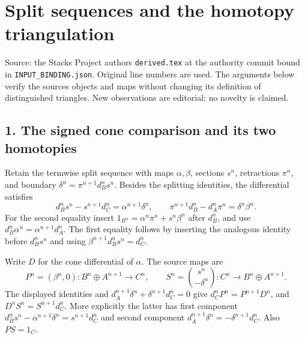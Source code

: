 \documentclass[11pt]{article}
\begin{document}
\section{Split sequences and the homotopy triangulation}\label{proofs-2995-3485-split-sequences-and-the-homotopy-triangulation}

Source:\allowbreak{} the Stacks Project authors\textquotesingle{} \texttt{derived.\allowbreak{}tex} at the authority commit bound in \texttt{INPUT\_\allowbreak{}BINDING.\allowbreak{}json}. Original line numbers are used. The arguments below verify the source\textquotesingle s objects and maps without changing its definition of distinguished triangles. New observations are editorial; no novelty is claimed.

\subsection{1. The signed cone comparison and its two homotopies}\label{proofs-2995-3485-the-signed-cone-comparison-and-its-two-homotopies}

Retain the termwise split sequence with maps \(\alpha,\beta\),\allowbreak{} sections \(s^n\),\allowbreak{} retractions \(\pi^n\),\allowbreak{} and boundary \(\delta^n=\pi^{n+1}d_B^ns^n\). Besides the splitting identities,\allowbreak{} the differential satisfies \[
d_B^ns^n-s^{n+1}d_C^n=\alpha^{n+1}\delta^n,
\qquad
\pi^{n+1}d_B^n-d_A^n\pi^n=\delta^n\beta^n.
\] For the second equality insert \(1_{B^n}=\alpha^n\pi^n+s^n\beta^n\) after \(d_B^n\),\allowbreak{} and use \(d_B^n\alpha^n=\alpha^{n+1}d_A^n\). The first equality follows by inserting the analogous identity before \(d_B^ns^n\) and using \(\beta^{n+1}d_B^ns^n=d_C^n\).

Write \(D\) for the cone differential of \(\alpha\). The source maps are \[
P^n=(\beta^n,0):B^n\oplus A^{n+1}\to C^n,
\qquad S^n=\binom{s^n}{-\delta^n}:C^n\to B^n\oplus A^{n+1}.
\] The displayed identities and \(d_A^{n+1}\delta^n+\delta^{n+1}d_C^n=0\) give \(d_C^nP^n=P^{n+1}D^n\),\allowbreak{} and \(D^nS^n=S^{n+1}d_C^n\). More explicitly the latter has first component \(d_B^ns^n-\alpha^{n+1}\delta^n=s^{n+1}d_C^n\) and second component \(d_A^{n+1}\delta^n=-\delta^{n+1}d_C^n\). Also \(PS=1_C\).
\end{document}

